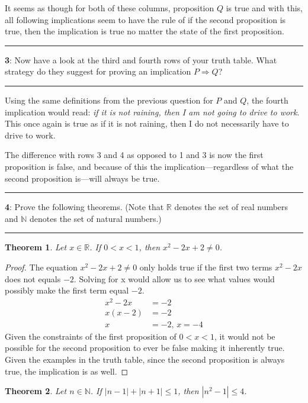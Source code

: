 \documentclass[11pt]{article}
\newtheorem{theorem}{Theorem}
\newcommand\question[2]{\vspace{.25in}\hrule\textbf{#1}: #2\vspace{.5em}\hrule\vspace{.10in}}
\newcommand{\R}{\mathbb{R}}
\newcommand{\N}{\mathbb{N}}
\begin{document}
	It seems as though for both of these columns, proposition $Q$ is true and with this, all following implications seem to have the rule of if the second proposition is true, then the implication is true no matter the state of the first proposition.

\question{3}{Now have a look at the third and fourth rows of your truth table. What strategy do they suggest for proving an implication $P \Rightarrow Q$?}

	Using the same definitions from the previous question for $P$ and $Q$, the fourth implication would read: \textit{if it is not raining, then I am not going to drive to work}. This once again is true as if it is not raining, then I do not necessarily have to drive to work.

	The difference with rows 3 and 4 as opposed to 1 and 3 is now the first proposition is false, and because of this the implication—regardless of what the second proposition is—will always be true.

\newpage

\question{4}{Prove the following theorems. (Note that $\R$ denotes the set of real numbers and $\N$ denotes the set of natural numbers.)}
	\begin{theorem}
		Let $x \in \R$. If $0 < x < 1$, then $x^2-2x+2 \ne 0$.
	\end{theorem}

	\begin{proof}
		The equation $x^2-2x+2 \ne 0$ only holds true if the first two terms $x^2-2x$ does not equals $-2$. Solving for x would allow us to see what values would possibly make the first term equal $-2$.
		\begin{align*}
			x^2-2x &= -2\\
			x(x-2) &= -2\\
			x &= -2 ,\, x = -4
		\end{align*}
		Given the constraints of the first proposition of $0<x<1$, it would not be possible for the second proposition to ever be false making it inherently true. Given the examples in the truth table, since the second proposition is always true, the implication is as well.
	\end{proof}

	\begin{theorem}
		Let $n \in \N$. If $|n-1|+|n+1| \le 1$, then $|n^2-1| \le 4$.
	\end{theorem}
\end{document}

